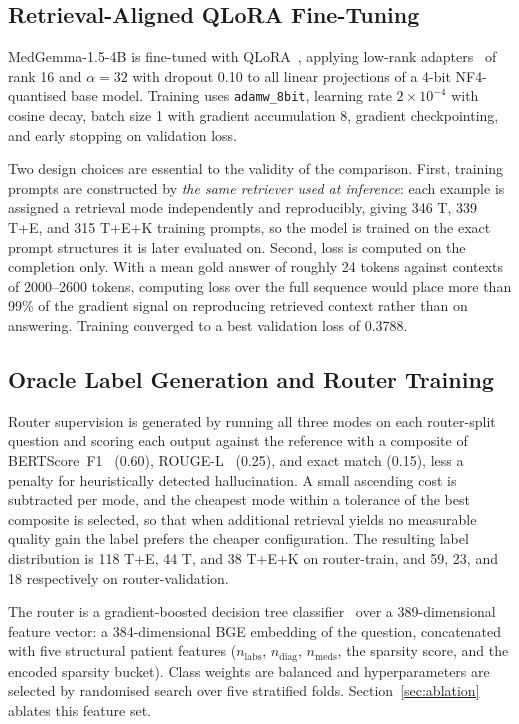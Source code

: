 \documentclass[preprint,12pt]{elsarticle}
\begin{document}
\subsection{Retrieval-Aligned QLoRA Fine-Tuning}

MedGemma-1.5-4B is fine-tuned with QLoRA~\cite{dettmers2023}, applying
low-rank adapters~\cite{hu2022} of rank 16 and $\alpha = 32$ with
dropout 0.10 to all linear projections of a 4-bit NF4-quantised base
model. Training uses \texttt{adamw\_8bit}, learning rate
$2\times10^{-4}$ with cosine decay, batch size 1 with gradient
accumulation 8, gradient checkpointing, and early stopping on
validation loss.

Two design choices are essential to the validity of the comparison.
First, training prompts are constructed by \textit{the same retriever
used at inference}: each example is assigned a retrieval mode
independently and reproducibly, giving 346 T, 339 T+E, and 315 T+E+K
training prompts, so the model is trained on the exact prompt
structures it is later evaluated on. Second, loss is computed on the
completion only. With a mean gold answer of roughly 24 tokens against
contexts of 2000--2600 tokens, computing loss over the full sequence
would place more than 99\% of the gradient signal on reproducing
retrieved context rather than on answering. Training converged to a
best validation loss of 0.3788.

\subsection{Oracle Label Generation and Router Training}

Router supervision is generated by running all three modes on each
router-split question and scoring each output against the reference
with a composite of BERTScore~F1~\cite{zhang2020} (0.60),
ROUGE-L~\cite{lin2004} (0.25), and exact match (0.15), less a penalty
for heuristically detected hallucination. A small ascending cost is subtracted per mode, and the
cheapest mode within a tolerance of the best composite is selected, so
that when additional retrieval yields no measurable quality gain the
label prefers the cheaper configuration. The resulting label
distribution is 118 T+E, 44 T, and 38 T+E+K on router-train, and 59,
23, and 18 respectively on router-validation.

The router is a gradient-boosted decision tree
classifier~\cite{chen2016} over a 389-dimensional feature vector: a
384-dimensional BGE embedding of the question, concatenated with five
structural patient features ($n_{\text{labs}}$, $n_{\text{diag}}$,
$n_{\text{meds}}$, the sparsity score, and the encoded sparsity
bucket). Class weights are balanced and hyperparameters are selected
by randomised search over five stratified folds. Section~\ref{sec:ablation}
ablates this feature set.
\end{document}
